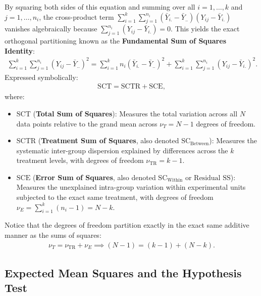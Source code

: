 By squaring both sides of this equation and summing over all $i = 1, \dots, k$ and $j = 1, \dots, n_i$, the cross-product term $\sum_{i=1}^k \sum_{j=1}^{n_i} (\bar{Y}_{i.} - \bar{Y}_{..})(Y_{ij} - \bar{Y}_{i.})$ vanishes algebraically because $\sum_{j=1}^{n_i} (Y_{ij} - \bar{Y}_{i.}) = 0$. This yields the exact orthogonal partitioning known as the \textbf{Fundamental Sum of Squares Identity}:
\begin{align}
	\sum_{i=1}^k \sum_{j=1}^{n_i} (Y_{ij} - \bar{Y}_{..})^2 = \sum_{i=1}^k n_i (\bar{Y}_{i.} - \bar{Y}_{..})^2 + \sum_{i=1}^k \sum_{j=1}^{n_i} (Y_{ij} - \bar{Y}_{i.})^2.
\end{align}
Expressed symbolically:
\begin{align}
	\text{SCT} = \text{SCTR} + \text{SCE},
\end{align}
where:
\begin{itemize}
	\item $\text{SCT}$ (\textbf{Total Sum of Squares}): Measures the total variation across all $N$ data points relative to the grand mean across $\nu_T = N - 1$ degrees of freedom.
	\item $\text{SCTR}$ (\textbf{Treatment Sum of Squares}, also denoted $\text{SC}_{\text{Between}}$): Measures the systematic inter-group dispersion explained by differences across the $k$ treatment levels, with degrees of freedom $\nu_{\text{TR}} = k - 1$.
	\item $\text{SCE}$ (\textbf{Error Sum of Squares}, also denoted $\text{SC}_{\text{Within}}$ or $\text{Residual SS}$): Measures the unexplained intra-group variation within experimental units subjected to the exact same treatment, with degrees of freedom $\nu_E = \sum_{i=1}^k (n_i - 1) = N - k$.
\end{itemize}

Notice that the degrees of freedom partition exactly in the exact same additive manner as the sums of squares:
\begin{align}
	\nu_T = \nu_{\text{TR}} + \nu_E \implies (N - 1) = (k - 1) + (N - k).
\end{align}

\subsection{Expected Mean Squares and the Hypothesis Test}

